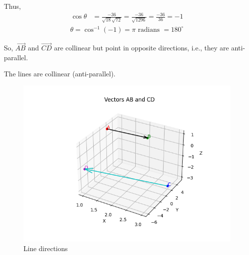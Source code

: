 \documentclass[12pt]{article}
\begin{document}
Thus,
\begin{align}
\cos\theta &= \frac{-36}{\sqrt{18}\sqrt{72}}
= \frac{-36}{\sqrt{1296}}
= \frac{-36}{36}
= -1
\end{align}
\begin{align}
\theta = \cos^{-1}(-1) = \pi \text{ radians } = 180^\circ
\end{align}

So, $\vec{AB}$ and $\vec{CD}$ are collinear but point in opposite directions, i.e., they are anti-parallel.

\vspace{0.5cm}
\centering
The lines are collinear (anti-parallel).

\begin{figure}[H]
    \centering
    \includegraphics[width=0.7\columnwidth]{Figs/Figure.png}
    \caption{Line directions}
    \label{fig:ab_cd}
\end{figure}
\end{document}

